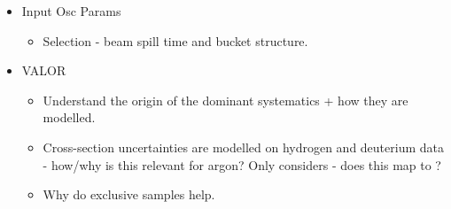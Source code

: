 \begin{itemize}
    \item Input Osc Params
    \begin{itemize}
        \item Selection - beam spill time and bucket structure.
    \end{itemize}
    
    \item VALOR
    \begin{itemize}
        \item Understand the origin of the dominant systematics + how they are modelled.
        \item Cross-section uncertainties are modelled on hydrogen and deuterium data - how/why is this relevant for argon? Only considers \numu - does this map to \nue?  
        \item Why do exclusive samples help. 
    \end{itemize}
\end{itemize}
